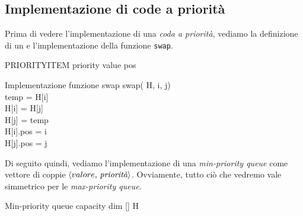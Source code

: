 \subsection{Implementazione di code a priorità}
Prima di vedere l'implementazione di una \emph{coda a priorità}, vediamo la
definizione di un \texttt{} e l'implementazione della funzione
\texttt{swap}.
\begin{minicode}{PRIORITYITEM}
     priority\hfill{}
     value\hfill{}
     pos\hfill{}
\end{minicode}
\begin{minicode}{Implementazione funzione swap}
    \ind swap( H,  i,  j)\\
         temp = H[i]\\
        H[i] = H[j]\\
        H[j] = temp\\
        H[i].pos = i\\
        H[j].pos = j
\end{minicode}\noindent
Di seguito quindi, vediamo l'implementazione di una \emph{min-priority queue}
come vettore di coppie $\langle valore,\,\emph{priorità}\rangle$. Ovviamente,
tutto ciò che vedremo vale simmetrico per le \emph{max-priority queue}.
\begin{minicode}{{Min-priority queue}}
     capacity\hfill{}
     dim\hfill{}
    [] H\hfill{}
\end{minicode}
\newpage
